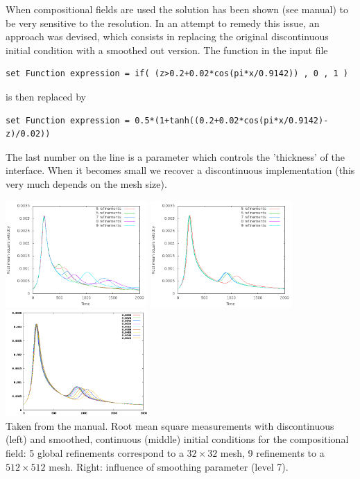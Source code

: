\begin{itemize}
When compositional fields are used the solution has been shown (see \aspect manual)
to be very sensitive to the resolution. In an attempt to remedy this issue, 
an approach was devised, which consists in replacing the original discontinuous initial 
condition with a smoothed out version. The function in the input file 
\begin{lstlisting}
set Function expression = if( (z>0.2+0.02*cos(pi*x/0.9142)) , 0 , 1 )
\end{lstlisting}
is then replaced by 
\begin{lstlisting}
set Function expression = 0.5*(1+tanh((0.2+0.02*cos(pi*x/0.9142)-z)/0.02))
\end{lstlisting}
The last number on the line is a parameter which controls the 'thickness' of the interface.
When it becomes small we recover a discontinuous implementation (this very much 
depends on the mesh size). 


\begin{center}
\includegraphics[width=5.4cm]{images/benchmark_vaks97/aspect/velocity-discontinuous}
\includegraphics[width=5.4cm]{images/benchmark_vaks97/aspect/velocity-smooth}
\includegraphics[width=5.4cm]{images/benchmark_vaks97/aspect/smoothing-parameter-velocity}\\
{\captionfont Taken from the \aspect manual. 
Root mean square measurements with discontinuous (left) and smoothed, continuous 
(middle) initial conditions for the compositional field: 5 global refinements correspond to 
a $32\times 32$ mesh, 9 refinements to a $512 \times 512$ mesh.
Right: influence of smoothing parameter (level 7).}
\end{center}




\end{itemize}
